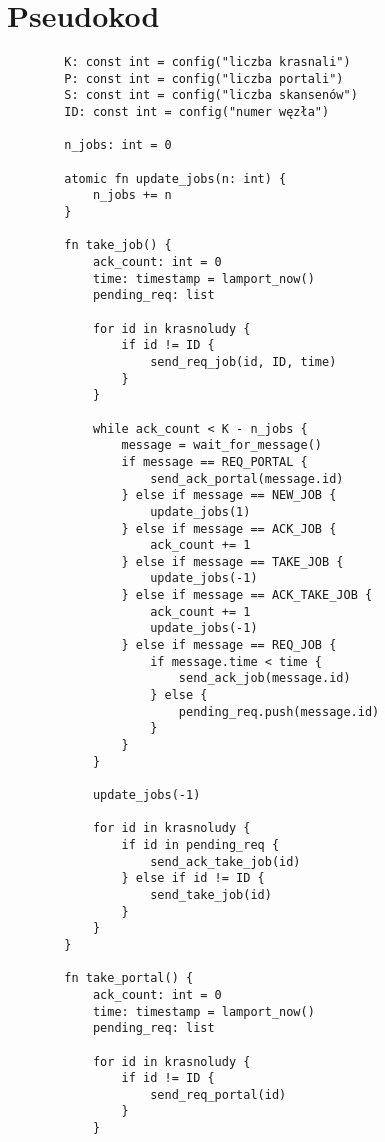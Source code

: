 \documentclass{article}
\begin{document}
    \section{Pseudokod}

    \begin{verbatim}
        K: const int = config("liczba krasnali")
        P: const int = config("liczba portali")
        S: const int = config("liczba skansenów")
        ID: const int = config("numer węzła")

        n_jobs: int = 0

        atomic fn update_jobs(n: int) {
            n_jobs += n
        }

        fn take_job() {
            ack_count: int = 0
            time: timestamp = lamport_now()
            pending_req: list

            for id in krasnoludy {
                if id != ID {
                    send_req_job(id, ID, time)
                }
            }

            while ack_count < K - n_jobs {
                message = wait_for_message()
                if message == REQ_PORTAL {
                    send_ack_portal(message.id)
                } else if message == NEW_JOB {
                    update_jobs(1)
                } else if message == ACK_JOB {
                    ack_count += 1
                } else if message == TAKE_JOB {
                    update_jobs(-1)
                } else if message == ACK_TAKE_JOB {
                    ack_count += 1
                    update_jobs(-1)
                } else if message == REQ_JOB {
                    if message.time < time {
                        send_ack_job(message.id)
                    } else {
                        pending_req.push(message.id)
                    }
                }
            }

            update_jobs(-1)

            for id in krasnoludy {
                if id in pending_req {
                    send_ack_take_job(id)
                } else if id != ID {
                    send_take_job(id)
                }
            }
        }

        fn take_portal() {
            ack_count: int = 0
            time: timestamp = lamport_now()
            pending_req: list

            for id in krasnoludy {
                if id != ID {
                    send_req_portal(id)
                }
            }


\end{verbatim}
\end{document}
